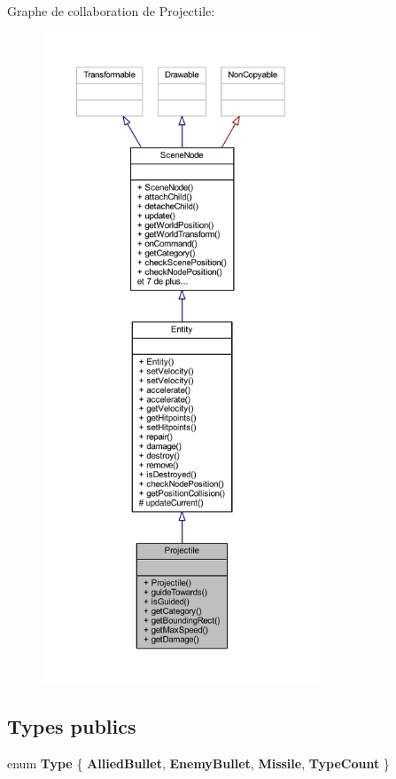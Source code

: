 Graphe de collaboration de Projectile\+:\nopagebreak
\begin{figure}[H]
\begin{center}
\leavevmode
\includegraphics[height=550pt]{class_projectile__coll__graph}
\end{center}
\end{figure}
\subsection*{Types publics}
\begin{DoxyCompactItemize}
\item 
\hypertarget{class_projectile_ae0d6ce4b663618b4105d2f3a483ff2eb}{}\label{class_projectile_ae0d6ce4b663618b4105d2f3a483ff2eb} 
enum {\bfseries Type} \{ {\bfseries Allied\+Bullet}, 
{\bfseries Enemy\+Bullet}, 
{\bfseries Missile}, 
{\bfseries Type\+Count}
 \}
\end{DoxyCompactItemize}
